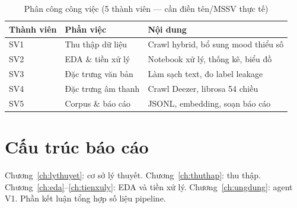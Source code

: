 \begin{table}[htbp]
  \centering
  \caption{Phân công công việc (5 thành viên --- cần điền tên/MSSV thực tế)}
  \label{tab:phan-cong}
  \begin{tabularx}{\textwidth}{@{}L{2.8cm}L{3.5cm}X@{}}
    \toprule
    \textbf{Thành viên} & \textbf{Phần việc} & \textbf{Nội dung} \\
    \midrule
    SV1 & Thu thập dữ liệu & Crawl hybrid, bổ sung mood thiểu số \\
    SV2 & EDA \& tiền xử lý & Notebook xử lý, thống kê, biểu đồ \\
    SV3 & Đặc trưng văn bản & Làm sạch text, đo label leakage \\
    SV4 & Đặc trưng âm thanh & Crawl Deezer, librosa 54 chiều \\
    SV5 & Corpus \& báo cáo & JSONL, embedding, soạn báo cáo \\
    \bottomrule
  \end{tabularx}
\end{table}

\section{Cấu trúc báo cáo}

Chương~\ref{ch:lythuyet}: cơ sở lý thuyết. Chương~\ref{ch:thuthap}: thu thập. Chương~\ref{ch:eda}--\ref{ch:tienxuly}: EDA và tiền xử lý. Chương~\ref{ch:ungdung}: agent V1. Phần kết luận tổng hợp số liệu pipeline.
